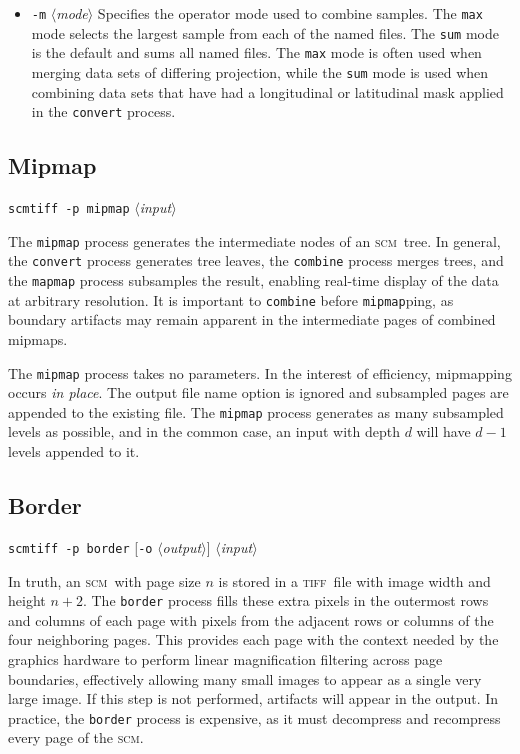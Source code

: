 \documentclass[oneside,10pt]{memoir}
\newcommand{\scm}     {\textsc{scm}}
\newcommand{\tiff}    {\textsc{tiff}}
\newcommand{\scmtiff} {\texttt{scmtiff}}
\newcommand{\inangles}[1]{$\langle$#1$\rangle$}
\newenvironment{optionlist}
  {\setlength{\leftmargini}{1in}\begin{itemize}}{\end{itemize}}
\begin{document}
\begin{Spacing}{1.1}
\begin{optionlist}
\item[\texttt{-m} \inangles{\textit{mode}}] Specifies the operator mode used to combine samples. The \texttt{max} mode selects the largest sample from each of the named files. The \texttt{sum} mode is the default and sums all named files. The \texttt{max} mode is often used when merging data sets of differing projection, while the \texttt{sum} mode is used when combining data sets that have had a longitudinal or latitudinal mask applied in the \texttt{convert} process.
\end{optionlist}

\subsection{Mipmap}

\noindent\scmtiff\ \texttt{-p mipmap} \inangles{\textit{input}}

\bigskip The \texttt{mipmap} process generates the intermediate nodes of an \scm\ tree. In general, the \texttt{convert} process generates tree leaves, the \texttt{combine} process merges trees, and the \texttt{mapmap} process subsamples the result, enabling real-time display of the data at arbitrary resolution. It is important to \texttt{combine} before \texttt{mipmap}ping, as boundary artifacts may remain apparent in the intermediate pages of combined mipmaps.

The \texttt{mipmap} process takes no parameters. In the interest of efficiency, mipmapping occurs \textit{in place}. The output file name option is ignored and subsampled pages are appended to the existing file. The \texttt{mipmap} process generates as many subsampled levels as possible, and in the common case, an input with depth $d$ will have $d-1$ levels appended to it.

\subsection{Border}

\noindent\scmtiff\ \texttt{-p border} [\texttt{-o} \inangles{\textit{output}}] \inangles{\textit{input}}

\bigskip In truth, an \scm\ with page size $n$ is stored in a \tiff\ file with image width and height $n+2$. The \texttt{border} process fills these extra pixels in the outermost rows and columns of each page with pixels from the adjacent rows or columns of the four neighboring pages. This provides each page with the context needed by the graphics hardware to perform linear magnification filtering across page boundaries, effectively allowing many small images to appear as a single very large image. If this step is not performed, artifacts will appear in the output. In practice, the \texttt{border} process is expensive, as it must decompress and recompress every page of the \scm.


\end{Spacing}
\end{document}
